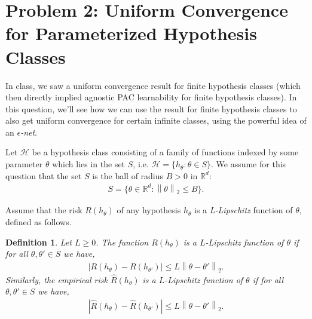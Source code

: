 \documentclass[11pt]{article}
\newcommand{\calH}{{\mathcal{H}}}
\newcommand{\R}{\mathbb{R}}
\newcommand{\twonorm}[1]{\left\| #1\right\|_2}
\newtheorem{definition}[theorem]{Definition}
\begin{document}
\section*{Problem 2: Uniform Convergence for Parameterized Hypothesis Classes}

In class, we saw a uniform convergence result for finite hypothesis classes (which then directly implied agnostic PAC learnability for finite hypothesis classes). In this question, we'll see how we can use the result for finite hypothesis classes to also get uniform convergence for certain infinite classes, using the powerful idea of an \emph{$\epsilon$-net}.

Let $\calH$ be a hypothesis class consisting of a family of functions indexed by some parameter $\theta$ which lies in the set $S$, i.e.
$\calH=\{h_{\theta}: \theta \in S\}$.
We assume for this question that the set $S$ is the ball of radius $B>0$ in $\R^d$:
\begin{align}
    S=\{\theta \in \R^d: \twonorm{\theta}\le B\}.
\end{align} 


Assume that the risk $R(h_{\theta})$  of any hypothesis $h_{\theta}$ is a \emph{L-Lipschitz} function of $\theta$, defined as follows.

\begin{definition}
Let $L\ge 0$. The function $R(h_\theta)$ is a $L$-Lipschitz function of $\theta$ if for all $\theta, \theta' \in S$ we have,
\begin{align*}
    | R(h_{\theta}) - R(h_{\theta'})| \le L \twonorm{\theta-\theta'}.
\end{align*}
Similarly, the empirical risk $\hat{R}(h_\theta)$ is a $L$-Lipschitz function of $\theta$ if for all $\theta, \theta' \in S$ we have,
\begin{align*}
    | \hat{R}(h_{\theta}) - \hat{R}(h_{\theta'})| \le L \twonorm{\theta-\theta'}.
\end{align*}

\end{definition}
\end{document}
